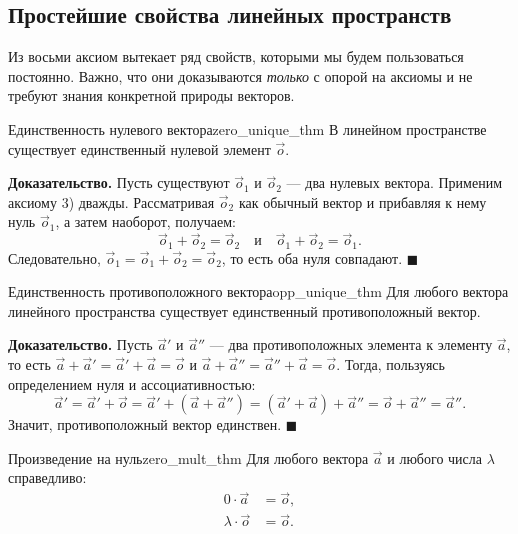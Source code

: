 \documentclass[12pt,a4paper]{article}
\newenvironment{myproof}{\noindent\textbf{Доказательство.}}{\hfill$\blacksquare$}
\begin{document}
\subsection*{Простейшие свойства линейных пространств}

Из восьми аксиом вытекает ряд свойств, которыми мы будем пользоваться
постоянно. Важно, что они доказываются \emph{только} с опорой на
аксиомы и не требуют знания конкретной природы векторов.

\begin{theorem}{Единственность нулевого вектора}{zero_unique_thm}
В линейном пространстве существует единственный нулевой элемент
$\vec{o}$.
\end{theorem}

\begin{myproof}
Пусть существуют $\vec{o}_1$ и $\vec{o}_2$ — два нулевых вектора.
Применим аксиому 3) дважды. Рассматривая $\vec{o}_2$ как обычный
вектор и прибавляя к нему нуль $\vec{o}_1$, а затем наоборот,
получаем:
\[
\vec{o}_1 + \vec{o}_2 = \vec{o}_2
\quad \text{и} \quad
\vec{o}_1 + \vec{o}_2 = \vec{o}_1.
\]
Следовательно, $\vec{o}_1 = \vec{o}_1 + \vec{o}_2 = \vec{o}_2$, то
есть оба нуля совпадают.
\end{myproof}

\begin{theorem}{Единственность противоположного вектора}{opp_unique_thm}
Для любого вектора линейного пространства существует единственный
противоположный вектор.
\end{theorem}

\begin{myproof}
Пусть $\vec{a}'$ и $\vec{a}''$ — два противоположных элемента к
элементу $\vec{a}$, то есть
$\vec{a} + \vec{a}' = \vec{a}' + \vec{a} = \vec{o}$ и
$\vec{a} + \vec{a}'' = \vec{a}'' + \vec{a} = \vec{o}$. Тогда,
пользуясь определением нуля и ассоциативностью:
\[
\vec{a}' = \vec{a}' + \vec{o} = \vec{a}' + (\vec{a} + \vec{a}'')
= (\vec{a}' + \vec{a}) + \vec{a}'' = \vec{o} + \vec{a}'' = \vec{a}''.
\]
Значит, противоположный вектор единствен.
\end{myproof}

\begin{theorem}{Произведение на нуль}{zero_mult_thm}
Для любого вектора $\vec{a}$ и любого числа $\lambda$ справедливо:
\begin{align}
0 \cdot \vec{a} &= \vec{o}, \tag{14.1}\label{eq:zeroa} \\
\lambda \cdot \vec{o} &= \vec{o}. \tag{14.2}\label{eq:lzero}
\end{align}
\end{theorem}
\end{document}
